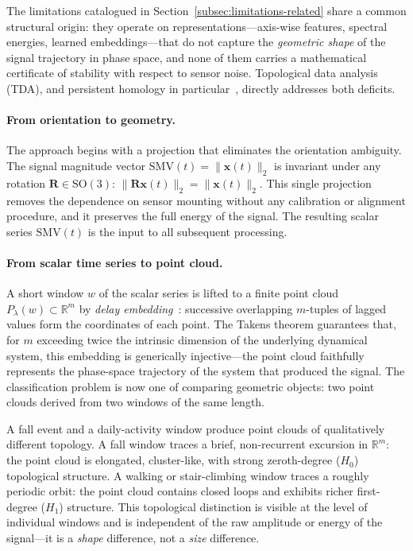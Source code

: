 \documentclass[onluarkali,ingilizce,yukseklisans,karton,LisansustuEgitim]{itutez}
\providecommand{\R}{\mathbb{R}}
\providecommand{\1}{\mathbf{1}}
\begin{document}
The limitations catalogued in Section~\ref{subsec:limitations-related} share a common structural origin: they operate on representations---axis-wise features, spectral energies, learned embeddings---that do not capture the \emph{geometric shape} of the signal trajectory in phase space, and none of them carries a mathematical certificate of stability with respect to sensor noise. Topological data analysis (TDA), and persistent homology in particular~\parencite{edelsbrunner2010computational, carlsson2009topology}, directly addresses both deficits.

\paragraph{From orientation to geometry.}
The approach begins with a projection that eliminates the orientation ambiguity. The signal magnitude vector $\mathrm{SMV}(t)=\|\mathbf{x}(t)\|_2$ is invariant under any rotation $\mathbf{R}\in\mathrm{SO}(3)$: $\|\mathbf{R}\mathbf{x}(t)\|_2=\|\mathbf{x}(t)\|_2$. This single projection removes the dependence on sensor mounting without any calibration or alignment procedure, and it preserves the full energy of the signal. The resulting scalar series $\mathrm{SMV}(t)$ is the input to all subsequent processing.

\paragraph{From scalar time series to point cloud.}
A short window $w$ of the scalar series is lifted to a finite point cloud $P_\lambda(w)\subset\R^m$ by \emph{delay embedding}~\parencite{takens1981detecting}: successive overlapping $m$-tuples of lagged values form the coordinates of each point. The Takens theorem guarantees that, for $m$ exceeding twice the intrinsic dimension of the underlying dynamical system, this embedding is generically injective---the point cloud faithfully represents the phase-space trajectory of the system that produced the signal. The classification problem is now one of comparing geometric objects: two point clouds derived from two windows of the same length.

A fall event and a daily-activity window produce point clouds of qualitatively different topology. A fall window traces a brief, non-recurrent excursion in $\R^m$: the point cloud is elongated, cluster-like, with strong zeroth-degree ($H_0$) topological structure. A walking or stair-climbing window traces a roughly periodic orbit: the point cloud contains closed loops and exhibits richer first-degree ($H_1$) structure. This topological distinction is visible at the level of individual windows and is independent of the raw amplitude or energy of the signal---it is a \emph{shape} difference, not a \emph{size} difference.
\end{document}
